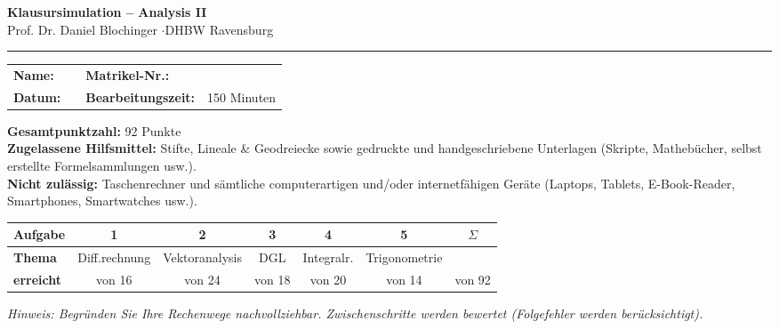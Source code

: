 \documentclass[a4paper,11pt]{article}
\begin{document}
\begin{center}
  {\LARGE\bfseries\color{accent} Klausursimulation -- Analysis II}\\[0.3em]
  {\normalsize Prof. Dr. Daniel Blochinger \quad$\cdot$\quad DHBW Ravensburg}
\end{center}
\vspace{0.6em}
\noindent\textcolor{gridcol}{\rule{\linewidth}{1pt}}\par\vspace{0.8em}

\renewcommand{\arraystretch}{1.8}
\noindent
\begin{tabular}{@{}p{2.2cm}p{5.3cm}@{\quad}p{3.6cm}p{4.5cm}@{}}
\textbf{Name:} & \textcolor{gridcol}{\hrulefill} & \textbf{Matrikel-Nr.:} & \textcolor{gridcol}{\hrulefill}\\
\textbf{Datum:} & \textcolor{gridcol}{\hrulefill} & \textbf{Bearbeitungszeit:} & 150 Minuten\\
\end{tabular}
\renewcommand{\arraystretch}{1.0}

\vspace{0.6em}
\noindent\textbf{Gesamtpunktzahl:} 92 Punkte\\[0.4em]
\noindent\textbf{Zugelassene Hilfsmittel:} Stifte, Lineale \& Geodreiecke sowie gedruckte und
handgeschriebene Unterlagen (Skripte, Mathebücher, selbst erstellte Formelsammlungen usw.).\\[0.2em]
\noindent\textbf{Nicht zulässig:} Taschenrechner und sämtliche computerartigen und/oder
internetfähigen Geräte (Laptops, Tablets, E-Book-Reader, Smartphones, Smartwatches usw.).

\vspace{1.0em}

\renewcommand{\arraystretch}{1.6}
\noindent
\begin{tabular}{|>{\bfseries}l|c|c|c|c|c||c|}
\hline
Aufgabe & 1 & 2 & 3 & 4 & 5 & $\Sigma$\\\hline
Thema & Diff.rechnung & Vektoranalysis & DGL & Integralr. & Trigonometrie & \\\hline
erreicht & von 16 & von 24 & von 18 & von 20 & von 14 & von 92\\\hline
\end{tabular}
\renewcommand{\arraystretch}{1.0}

\vspace{1.0em}
\noindent\textit{Hinweis: Begründen Sie Ihre Rechenwege nachvollziehbar. Zwischenschritte werden
bewertet (Folgefehler werden berücksichtigt).}
\end{document}
